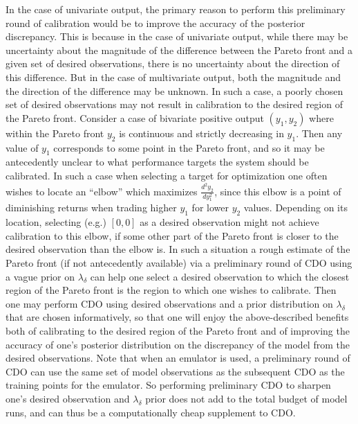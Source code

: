 \documentclass{article}
\begin{document}
In the case of univariate output, the primary reason to perform this preliminary round of calibration would be to improve the accuracy of the posterior discrepancy. 
%
This is because in the case of univariate output, while there may be uncertainty about the magnitude of the difference between the Pareto front and a given set of desired observations, there is no uncertainty about the direction of this difference.
%
But in the case of multivariate output, both the magnitude and the direction of the difference may be unknown.
%
In such a case, a poorly chosen set of desired observations may not result in calibration to the desired region of the Pareto front.
%
Consider a case of bivariate positive output $(y_1,y_2)$ where within the Pareto front $y_2$ is continuous and strictly decreasing in $y_1$. 
%
Then any value of $y_1$ corresponds to some point in the Pareto front, and so it may be antecedently unclear to what performance targets the system should be calibrated.
%
In such a case when selecting a target for optimization one often wishes to locate an ``elbow'' which maximizes $\frac{d^2 y_2}{dy_1^2}$, 
since this elbow is a point of diminishing returns when trading higher $y_1$ for lower $y_2$ values.
%
Depending on its location, selecting (e.g.) $[0,0]$ as a desired observation might not achieve calibration to this elbow, if some other part of the Pareto front is closer to the desired observation than the elbow is.
%
In such a situation a rough estimate of the Pareto front (if not antecedently available) via a preliminary round of CDO using a vague prior on $\lambda_\delta$ can help one select a desired observation to which the closest region of the Pareto front is the region to which one wishes to calibrate.
%
Then one may perform CDO using desired observations and a prior distribution on $\lambda_\delta$ that are chosen informatively, so that one will enjoy the above-described benefits both of calibrating to the desired region of the Pareto front and of improving the accuracy of one's posterior distribution on the discrepancy of the model from the desired observations.
%
Note that when an emulator is used, a preliminary round of CDO can use the same set of model observations as the subsequent CDO as the training points for the emulator.
%
So performing preliminary CDO to sharpen one's desired observation and $\lambda_\delta$ prior does not add to the total budget of model runs, and can thus be a computationally cheap supplement to CDO.
\end{document}
